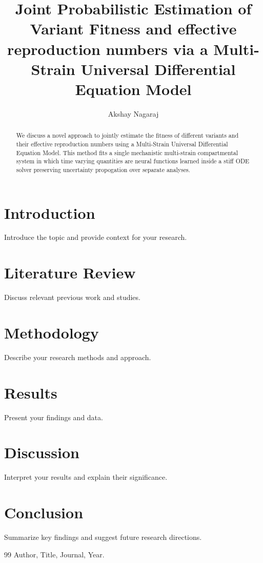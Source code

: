 \documentclass[12pt]{article}
\title{Joint Probabilistic Estimation of Variant Fitness and effective reproduction numbers via a Multi-Strain Universal Differential Equation Model}
\author{Akshay Nagaraj}
\begin{document}
\maketitle

\begin{abstract}
    We discuss a novel approach to jointly estimate the fitness of different variants and their effective reproduction numbers using a Multi-Strain Universal Differential Equation Model. 
    This method fits a single mechanistic multi-strain compartmental system in which time varying quantities are neural functions learned inside a stiff ODE solver preserving uncertainty propogation over separate analyses. 
\end{abstract}

\section{Introduction}
    Introduce the topic and provide context for your research.

\section{Literature Review}
    Discuss relevant previous work and studies.

\section{Methodology}
    Describe your research methods and approach.

\section{Results}
    Present your findings and data.

\section{Discussion}
    Interpret your results and explain their significance.

\section{Conclusion}
    Summarize key findings and suggest future research directions.

\begin{thebibliography}{99}
     Author, Title, Journal, Year.
\end{thebibliography}
\end{document}

